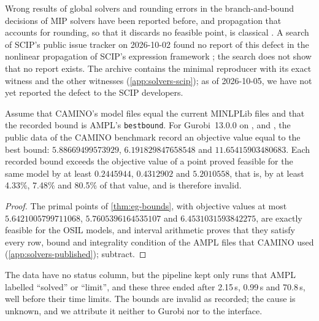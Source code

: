 Wrong results of global solvers \citep{neumaier2005-a-comparison-of-complete-global,nowak2008-lago-a-heuristic-branch-and,montanher2018-a-computational-study-of-global,bestuzheva2025-global-optimization-of-mixed-integer} and rounding errors in the branch-and-bound decisions of MIP solvers \citep{hoen2025-analyzing-the-numerical-correctness-of} have been reported before, and propagation that accounts for rounding, so that it discards no feasible point, is classical \citep{domes2010-constraint-propagation-on-quadratic-constraints}.
A search of SCIP's public issue tracker on 2026-10-02 found no report of this defect in the nonlinear propagation of SCIP's expression framework \citep{bestuzheva2025-global-optimization-of-mixed-integer,hojny2025-the-scip-optimization-suite-10}; the search does not show that no report exists.
The archive contains the minimal reproducer  with its exact witness and the other witnesses (\cref{app:solvers-scip}); as of 2026-10-05, we have not yet reported the defect to the SCIP developers.

\begin{proposition}\label{prop:camino-eg}
Assume that CAMINO's model files equal the current MINLPLib files and that the recorded bound is AMPL's \texttt{bestbound}.
For Gurobi~13.0.0 on ,  and , the public data of the CAMINO benchmark \citep{ghezzi2026-camino-benchmark-results-for-nonconvex} record an objective value equal to the best bound: $5.88669499573929$, $6.191829847658548$ and $11.65415903480683$.
Each recorded bound exceeds the objective value of a point proved feasible for the same model by at least $0.2445944$, $0.4312902$ and $5.2010558$, that is, by at least 4.33\%, 7.48\% and 80.5\% of that value, and is therefore invalid.
\end{proposition}

\begin{proof}
The primal points of \cref{thm:eg-bounds}, with objective values at most $5.6421005799711068$, $5.7605396164535107$ and $6.4531031593842275$, are exactly feasible for the OSIL models, and interval arithmetic proves that they satisfy every row, bound and integrality condition of the AMPL files that CAMINO used (\cref{app:solvers-published}); subtract.
\end{proof}

The data have no status column, but the pipeline kept only runs that AMPL labelled ``solved'' or ``limit'', and these three ended after 2.15\,s, 0.99\,s and 70.8\,s, well before their time limits.
The bounds are invalid as recorded; the cause is unknown, and we attribute it neither to Gurobi nor to the interface.

